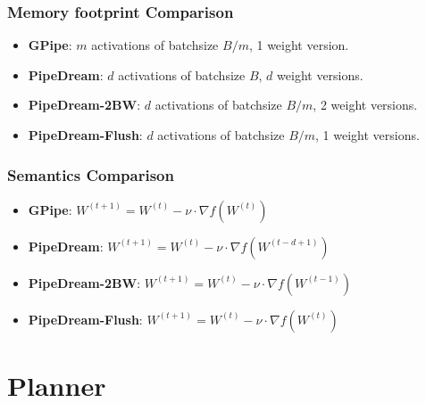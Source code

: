 \documentclass[12pt,aspectratio=169]{beamer}
\begin{document}
    \begin{frame}
        \frametitle{Memory footprint Comparison}

        \begin{itemize}
            \setlength{\itemsep}{.8em}
            \item \textbf{GPipe}: $m$ activations of batchsize $B/m$, 1 weight version.
            \item \textbf{PipeDream}: $d$ activations of batchsize $B$, $d$ weight versions.
            \item \textbf{PipeDream-2BW}: $d$ activations of batchsize $B/m$, 2 weight versions.
            \item \textbf{PipeDream-Flush}: $d$ activations of batchsize $B/m$, 1 weight versions.
        \end{itemize}
    \end{frame}

    \begin{frame}
        \frametitle{Semantics Comparison}

        \begin{itemize}
            \setlength{\itemsep}{.8em}
            \item \textbf{GPipe}: $W^{(t+1)} = W^{(t)} - \nu \cdot \nabla f(W^{(t)})$
            \item \textbf{PipeDream}: $W^{(t+1)} = W^{(t)} - \nu \cdot \nabla f(W^{(t-d+1)})$
            \item \textbf{PipeDream-2BW}: $W^{(t+1)} = W^{(t)} - \nu \cdot \nabla f(W^{(t-1)})$
            \item \textbf{PipeDream-Flush}: $W^{(t+1)} = W^{(t)} - \nu \cdot \nabla f(W^{(t)})$
        \end{itemize}
    \end{frame}

    \section{Planner}
\end{document}
